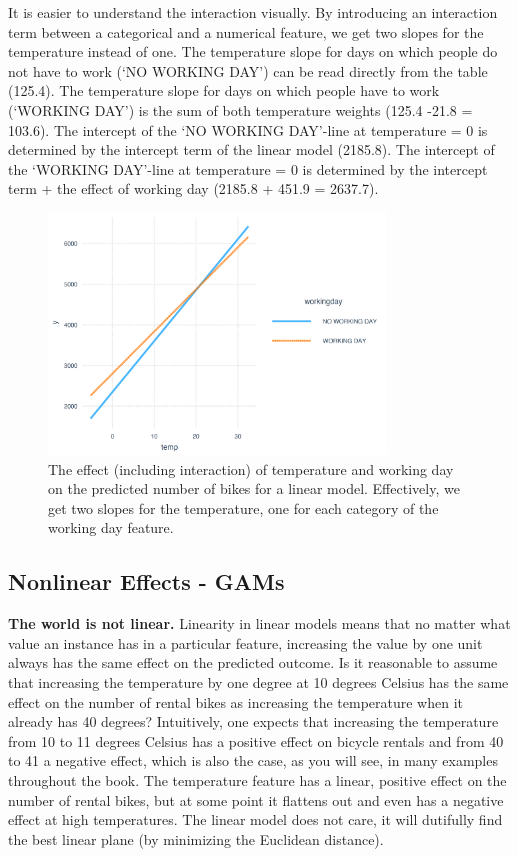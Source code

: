 \documentclass[
  11pt,
]{scrbook}
\begin{document}
It is easier to understand the interaction visually.
By introducing an interaction term between a categorical and a numerical feature, we get two slopes for the temperature instead of one.
The temperature slope for days on which people do not have to work (`NO WORKING DAY') can be read directly from the table (125.4).
The temperature slope for days on which people have to work (`WORKING DAY') is the sum of both temperature weights (125.4 -21.8 = 103.6).
The intercept of the `NO WORKING DAY'-line at temperature = 0 is determined by the intercept term of the linear model (2185.8).
The intercept of the `WORKING DAY'-line at temperature = 0 is determined by the intercept term + the effect of working day (2185.8 + 451.9 = 2637.7).

\begin{figure}

{\centering \includegraphics[width=0.8\textwidth]{images/interaction-plot-1} 

}

\caption{The effect (including interaction) of temperature and working day on the predicted number of bikes for a linear model. Effectively, we get two slopes for the temperature, one for each category of the working day feature.}\label{fig:interaction-plot}
\end{figure}

\hypertarget{gam}{%
\subsection{Nonlinear Effects - GAMs}\label{gam}}

\textbf{The world is not linear.}
Linearity in linear models means that no matter what value an instance has in a particular feature, increasing the value by one unit always has the same effect on the predicted outcome.
Is it reasonable to assume that increasing the temperature by one degree at 10 degrees Celsius has the same effect on the number of rental bikes as increasing the temperature when it already has 40 degrees?
Intuitively, one expects that increasing the temperature from 10 to 11 degrees Celsius has a positive effect on bicycle rentals and from 40 to 41 a negative effect, which is also the case, as you will see, in many examples throughout the book.
The temperature feature has a linear, positive effect on the number of rental bikes, but at some point it flattens out and even has a negative effect at high temperatures.
The linear model does not care, it will dutifully find the best linear plane (by minimizing the Euclidean distance).
\end{document}
